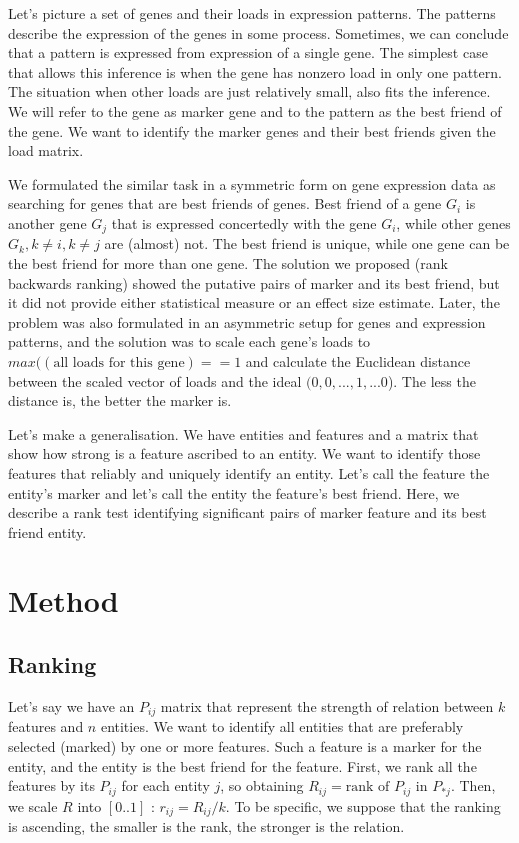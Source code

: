 \documentclass{llncs}
\begin{document}
Let's picture a set of genes and their loads in expression patterns. The patterns describe the expression of the genes in some process. Sometimes, we can conclude that a pattern is expressed from expression of a single gene. The simplest case that allows this inference is when the gene has nonzero load in only one pattern. The situation when other loads are just relatively small, also fits the inference. We will refer to the gene as marker gene and to the pattern as the best friend of the gene. We want to identify the marker genes and their best friends given the load matrix.

We formulated \cite{best_friends:2015} the similar task in a symmetric form on gene expression data as searching for genes that are best friends of genes. Best friend of a gene $G_i$ is another gene $G_j$ that is expressed concertedly with the gene $G_i$, while other genes $G_k, k\neq i, k \neq j$ are (almost) not. The best friend is unique, while one gene can be the best friend for more than one gene. The solution we proposed (rank backwards ranking) showed the putative pairs of marker and its best friend, but it did not provide either statistical measure or an effect size estimate. Later, the problem was also formulated in an asymmetric setup \cite{patternmarkers:2017} for genes and expression patterns, and the solution was to scale each gene's loads to $max((\mbox{all loads for this gene})==1$ and calculate the Euclidean distance between the scaled vector of loads and the ideal $(0,0,...,1,...0$). The less the distance is, the better the marker is. 

Let's make a generalisation. We have entities and features and a matrix that show how strong is a feature ascribed to an entity. We want to identify those features that reliably and uniquely identify an entity. Let's call the feature the entity's marker and let's call the entity the feature's best friend. Here, we describe a rank test identifying significant pairs of marker feature and its best friend entity.
%
\section{Method}
\subsection{Ranking}
Let's say we have an $P_{ij}$ matrix that represent the strength of relation between $k$ features and $n$ entities. We want to identify all entities that are preferably selected (marked) by one or more features. Such a feature is a marker for the entity, and the entity is the best friend for the feature.
First, we rank all the features by its $P_{ij}$ for each entity $j$, so obtaining $R_{ij}= \textrm{rank of } P_{ij} \textrm{ in } P_{*j}$. Then, we scale $R$ into $[0..1]$ : $r_{ij}={R_{ij}}/{k}$. To be specific, we suppose that the ranking is ascending, the smaller is the rank, the stronger is the relation.
\end{document}
